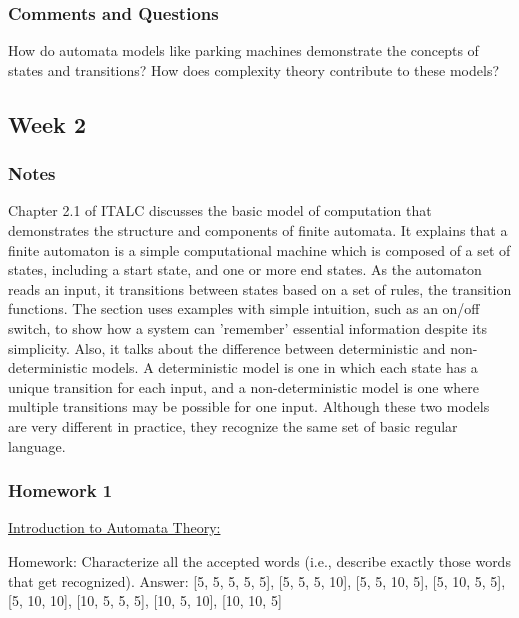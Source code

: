 \documentclass{article}
\theoremstyle{theorem}
\theoremstyle{definition}
\theoremstyle{remark}
\begin{document}



\subsubsection*{Comments and Questions}

How do automata models like parking machines demonstrate the concepts of states and transitions? How does complexity theory contribute to these models?

\subsection{Week 2}

\subsubsection*{Notes}

Chapter 2.1 of ITALC discusses the basic model of computation that demonstrates the structure and components of finite automata. It explains that a finite automaton is a simple computational machine which is composed of a set of states, including a start state, and one or more end states. As the automaton reads an input, it transitions between states based on a set of rules, the transition functions. The section uses examples with simple intuition, such as an on/off switch, to show how a system can 'remember' essential information despite its simplicity. Also, it talks about the difference between deterministic and non-deterministic models. A deterministic model is one in which each state has a unique transition for each input, and a non-deterministic model is one where multiple transitions may be possible for one input. Although these two models are very different in practice, they recognize the same set of basic regular language. 

\subsubsection*{Homework 1}

\underline{Introduction to Automata Theory:}

Homework: Characterize all the accepted words (i.e., describe exactly those words that get recognized).\newline
Answer:  [5, 5, 5, 5, 5], [5, 5, 5, 10], [5, 5, 10, 5], [5, 10, 5, 5], [5, 10, 10], [10, 5, 5, 5], [10, 5, 10], [10, 10, 5]
\end{document}

